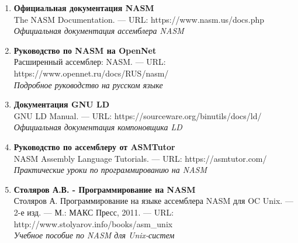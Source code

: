 \documentclass[
  english,
  russian,
  13pt,
  a4paper,
  DIV=11,
  numbers=noendperiod]{scrreprt}
\begin{document}
\begin{enumerate}
\def\labelenumi{\arabic{enumi}.}
\item
  \textbf{Официальная документация NASM}\\
  The NASM Documentation. --- URL: https://www.nasm.us/docs.php\\
  \emph{Официальная документация ассемблера NASM}
\item
  \textbf{Руководство по NASM на OpenNet}\\
  Расширенный ассемблер: NASM. --- URL:
  https://www.opennet.ru/docs/RUS/nasm/\\
  \emph{Подробное руководство на русском языке}
\item
  \textbf{Документация GNU LD}\\
  GNU LD Manual. --- URL: https://sourceware.org/binutils/docs/ld/\\
  \emph{Официальная документация компоновщика LD}
\item
  \textbf{Руководство по ассемблеру от ASMTutor}\\
  NASM Assembly Language Tutorials. --- URL: https://asmtutor.com/\\
  \emph{Практические уроки по программированию на NASM}
\item
  \textbf{Столяров А.В. - Программирование на NASM}\\
  Столяров А. Программирование на языке ассемблера NASM для OC Unix. ---
  2-е изд. --- М.: МАКС Пресс, 2011. --- URL:
  http://www.stolyarov.info/books/asm\_unix\\
  \emph{Учебное пособие по NASM для Unix-систем}
\end{enumerate}


\printbibliography
\end{document}
